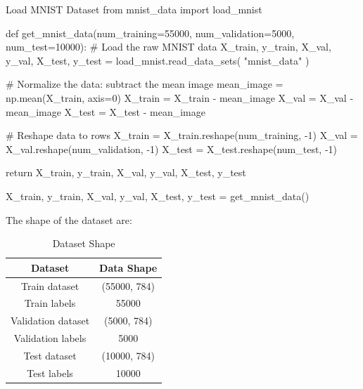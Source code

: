 \documentclass[12pt, a4paper]{article}
\begin{document}
                \begin{codeblock}{Load MNIST Dataset}
                    from mnist_data import load_mnist

                        def get_mnist_data(num_training=55000, num_validation=5000, num_test=10000):
                            # Load the raw MNIST data
                            X_train, y_train, X_val, y_val, X_test, y_test = load_mnist.read_data_sets(
                                "mnist_data"
                            )

                            # Normalize the data: subtract the mean image
                            mean_image = np.mean(X_train, axis=0)
                            X_train = X_train - mean_image
                            X_val = X_val - mean_image
                            X_test = X_test - mean_image

                            # Reshape data to rows
                            X_train = X_train.reshape(num_training, -1)
                            X_val = X_val.reshape(num_validation, -1)
                            X_test = X_test.reshape(num_test, -1)

                            return X_train, y_train, X_val, y_val, X_test, y_test

                        X_train, y_train, X_val, y_val, X_test, y_test = get_mnist_data()
                \end{codeblock}

    \pagebreak

                The shape of the dataset are:
                \begin{table}[h]
                    \centering
                    \begin{tabular}{|c|c|}
                        \hline
                        Dataset & Data Shape \\
                        \hline \hline
                        Train dataset & (55000, 784) \\
                        Train labels & 55000 \\
                        \hline
                        Validation dataset & (5000, 784) \\
                        Validation labels & 5000 \\
                        \hline
                        Test dataset & (10000, 784) \\
                        Test labels & 10000 \\
                        \hline
                    \end{tabular}
                    \caption{Dataset Shape}
                \end{table}
\end{document}
